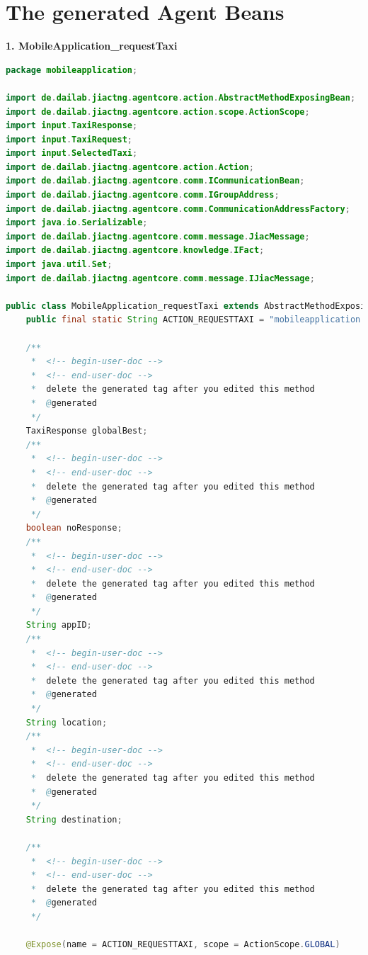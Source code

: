 \newpage
\section{The generated Agent Beans}
\textbf{1. MobileApplication\_requestTaxi}\\

\begin{lstlisting}[language=java, caption= Generated Agent Bean - MobileApplication\_requestTaxi]
package mobileapplication;

import de.dailab.jiactng.agentcore.action.AbstractMethodExposingBean;
import de.dailab.jiactng.agentcore.action.scope.ActionScope;
import input.TaxiResponse;
import input.TaxiRequest;
import input.SelectedTaxi;
import de.dailab.jiactng.agentcore.action.Action;
import de.dailab.jiactng.agentcore.comm.ICommunicationBean;
import de.dailab.jiactng.agentcore.comm.IGroupAddress;
import de.dailab.jiactng.agentcore.comm.CommunicationAddressFactory;
import java.io.Serializable;
import de.dailab.jiactng.agentcore.comm.message.JiacMessage;
import de.dailab.jiactng.agentcore.knowledge.IFact;
import java.util.Set;
import de.dailab.jiactng.agentcore.comm.message.IJiacMessage;

public class MobileApplication_requestTaxi extends AbstractMethodExposingBean{
	public final static String ACTION_REQUESTTAXI = "mobileapplication.MobileApplication_requestTaxi#requestTaxi"; 

	/**
	 *  <!-- begin-user-doc -->
	 *  <!-- end-user-doc -->
	 *	delete the generated tag after you edited this method
	 *  @generated
	 */
	TaxiResponse globalBest;
	/**
	 *  <!-- begin-user-doc -->
	 *  <!-- end-user-doc -->
	 *	delete the generated tag after you edited this method
	 *  @generated
	 */
	boolean noResponse;
	/**
	 *  <!-- begin-user-doc -->
	 *  <!-- end-user-doc -->
	 *	delete the generated tag after you edited this method
	 *  @generated
	 */
	String appID;
	/**
	 *  <!-- begin-user-doc -->
	 *  <!-- end-user-doc -->
	 *	delete the generated tag after you edited this method
	 *  @generated
	 */
	String location;
	/**
	 *  <!-- begin-user-doc -->
	 *  <!-- end-user-doc -->
	 *	delete the generated tag after you edited this method
	 *  @generated
	 */
	String destination;

	/**
	 *  <!-- begin-user-doc -->
	 *  <!-- end-user-doc -->
	 *	delete the generated tag after you edited this method
	 *  @generated
	 */
	
	@Expose(name = ACTION_REQUESTTAXI, scope = ActionScope.GLOBAL)
	

\end{lstlisting}
